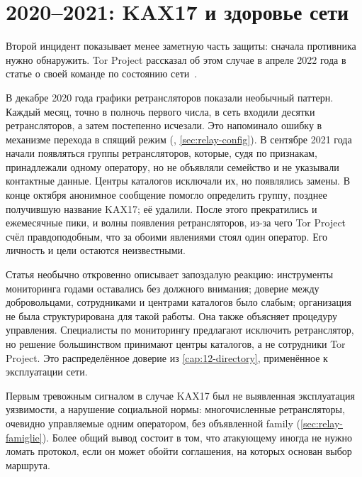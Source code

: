 \section{2020--2021: KAX17 и здоровье сети}\label{sec:casi-kax17}

Второй инцидент показывает менее заметную часть защиты: сначала противника нужно обнаружить. Tor Project рассказал об этом случае в апреле 2022 года в статье о своей команде по состоянию сети~\cite{torblog2022badrelays}.

В декабре 2020 года графики ретрансляторов показали необычный паттерн. Каждый месяц, точно в полночь первого числа, в сеть входили десятки ретрансляторов, а затем постепенно исчезали. Это напоминало ошибку в механизме перехода в спящий режим (, \cref{sec:relay-config}). В сентябре 2021 года начали появляться группы ретрансляторов, которые, судя по признакам, принадлежали одному оператору, но не объявляли семейство и не указывали контактные данные. Центры каталогов исключали их, но появлялись замены. В конце октября анонимное сообщение помогло определить группу, позднее получившую название KAX17; её удалили. После этого прекратились и ежемесячные пики, и волны появления ретрансляторов, из-за чего Tor Project счёл правдоподобным, что за обоими явлениями стоял один оператор. Его личность и цели остаются неизвестными.

Статья необычно откровенно описывает запоздалую реакцию: инструменты мониторинга годами оставались без должного внимания; доверие между добровольцами, сотрудниками и центрами каталогов было слабым; организация не была структурирована для такой работы. Она также объясняет процедуру управления. Специалисты по мониторингу предлагают исключить ретранслятор, но решение большинством принимают центры каталогов, а не сотрудники Tor Project. Это распределённое доверие из \cref{cap:12-directory}, применённое к эксплуатации сети.

\begin{approfondimento}
Первым тревожным сигналом в случае KAX17 был не выявленная эксплуатация уязвимости, а нарушение социальной нормы: многочисленные ретрансляторы, очевидно управляемые одним оператором, без объявленной family (\cref{sec:relay-famiglie}). Более общий вывод состоит в том, что атакующему иногда не нужно ломать протокол, если он может обойти соглашения, на которых основан выбор маршрута.
\end{approfondimento}

